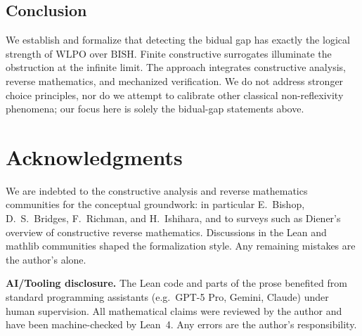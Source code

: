 \documentclass[11pt]{article}
\newcommand{\WLPO}{\mathrm{WLPO}}
\newcommand{\BISH}{\mathrm{BISH}}
\begin{document}
\subsection{Conclusion}

We establish and formalize that detecting the bidual gap has exactly the logical strength of $\WLPO$ over $\BISH$. Finite constructive surrogates illuminate the obstruction at the infinite limit. The approach integrates constructive analysis, reverse mathematics, and mechanized verification. We do not address stronger choice principles, nor do we attempt to calibrate other classical non-reflexivity phenomena; our focus here is solely the bidual-gap statements above.

\section*{Acknowledgments}

We are indebted to the constructive analysis and reverse mathematics communities for the conceptual groundwork: in particular E.~Bishop, D.~S.~Bridges, F.~Richman, and H.~Ishihara, and to surveys such as Diener's overview of constructive reverse mathematics. Discussions in the Lean and mathlib communities shaped the formalization style. Any remaining mistakes are the author's alone.

\smallskip
\noindent\textbf{AI/Tooling disclosure.} The Lean code and parts of the prose benefited from standard programming assistants (e.g.\ GPT-5 Pro, Gemini, Claude) under human supervision. All mathematical claims were reviewed by the author and have been machine-checked by Lean~4. Any errors are the author's responsibility.
\end{document}
